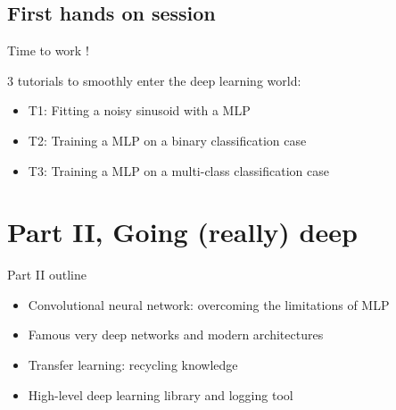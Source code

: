 \documentclass[usenames,dvipsnames]{beamer}
\begin{document}
    
    \subsection[Hands on]{First hands on session}
    \begin{frame}{\secname}{\subsecname}
        \begin{center}
            Time to work !
        \end{center}
        3 tutorials to smoothly enter the deep learning world:
        \begin{itemize}
            \item T1: Fitting a noisy sinusoid with a MLP
            \item T2: Training a MLP on a binary classification case
            \item T3: Training a MLP on a multi-class classification case
        \end{itemize}
    \end{frame}


\section[Going deep]{Part II, Going (really) deep}
    
    \begin{frame}{\secname}
        Part II outline
        \begin{itemize}
            \item Convolutional neural network: overcoming the limitations of MLP
            \item Famous very deep networks and modern architectures
            \item Transfer learning: recycling knowledge
            \item High-level deep learning library and logging tool
        \end{itemize}
    \end{frame}
    
\end{document}
